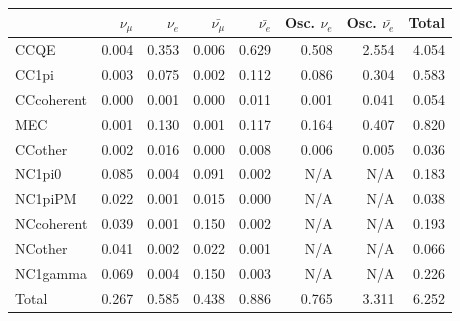 
\begin{table}
\center
\begin{tabular} { | l ||r | r | r | r | r | r | | r | }
\hline
              & $\nu_\mu$            & $\nu_e$              & $\bar{\nu_\mu}$      & $\bar{\nu_e}$        & Osc. $\nu_e$         & Osc. $\bar{\nu_e}$   & Total                \\ \hline\hline

 CCQE         & 0.004                & 0.353                & 0.006                & 0.629                & 0.508                & 2.554                & 4.054                \\ \hline
 CC1pi        & 0.003                & 0.075                & 0.002                & 0.112                & 0.086                & 0.304                & 0.583                \\ \hline
 CCcoherent   & 0.000                & 0.001                & 0.000                & 0.011                & 0.001                & 0.041                & 0.054                \\ \hline
 MEC          & 0.001                & 0.130                & 0.001                & 0.117                & 0.164                & 0.407                & 0.820                \\ \hline
 CCother      & 0.002                & 0.016                & 0.000                & 0.008                & 0.006                & 0.005                & 0.036                \\ \hline
 NC1pi0       & 0.085                & 0.004                & 0.091                & 0.002                & N/A                  & N/A                  & 0.183                \\ \hline
 NC1piPM      & 0.022                & 0.001                & 0.015                & 0.000                & N/A                  & N/A                  & 0.038                \\ \hline
 NCcoherent   & 0.039                & 0.001                & 0.150                & 0.002                & N/A                  & N/A                  & 0.193                \\ \hline
 NCother      & 0.041                & 0.002                & 0.022                & 0.001                & N/A                  & N/A                  & 0.066                \\ \hline
 NC1gamma     & 0.069                & 0.004                & 0.150                & 0.003                & N/A                  & N/A                  & 0.226                \\ \hline
\hline
 Total        & 0.267                & 0.585                & 0.438                & 0.886                & 0.765                & 3.311                & 6.252                \\ \hline


\end{tabular}
\end{table}
